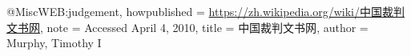 @Misc{WEB:judgement,
  howpublished = {\url{https://zh.wikipedia.org/wiki/中国裁判文书网}},
  note = {Accessed April 4, 2010},
  title = {中国裁判文书网},
  author = {Murphy, Timothy I}
}